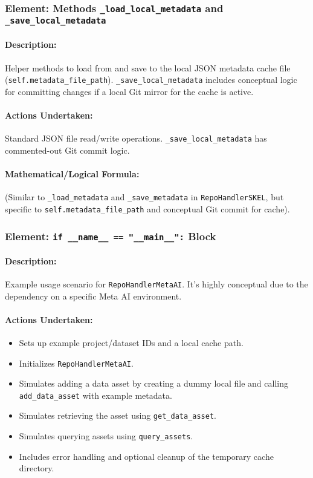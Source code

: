 \documentclass{article}
\begin{document}
\subsubsection{Element: Methods \texttt{\_load\_local\_metadata} and \texttt{\_save\_local\_metadata}}
\paragraph{Description:} Helper methods to load from and save to the local JSON metadata cache file (\texttt{self.metadata\_file\_path}). \texttt{\_save\_local\_metadata} includes conceptual logic for committing changes if a local Git mirror for the cache is active.
\paragraph{Actions Undertaken:} Standard JSON file read/write operations. \texttt{\_save\_local\_metadata} has commented-out Git commit logic.
\paragraph{Mathematical/Logical Formula:} (Similar to \texttt{\_load\_metadata} and \texttt{\_save\_metadata} in \texttt{RepoHandlerSKEL}, but specific to \texttt{self.metadata\_file\_path} and conceptual Git commit for cache).

\subsubsection{Element: \texttt{if \_\_name\_\_ == "\_\_main\_\_":} Block}
\paragraph{Description:} Example usage scenario for \texttt{RepoHandlerMetaAI}. It's highly conceptual due to the dependency on a specific Meta AI environment.
\paragraph{Actions Undertaken:}
\begin{itemize}
    \item Sets up example project/dataset IDs and a local cache path.
    \item Initializes \texttt{RepoHandlerMetaAI}.
    \item Simulates adding a data asset by creating a dummy local file and calling \texttt{add\_data\_asset} with example metadata.
    \item Simulates retrieving the asset using \texttt{get\_data\_asset}.
    \item Simulates querying assets using \texttt{query\_assets}.
    \item Includes error handling and optional cleanup of the temporary cache directory.
\end{itemize}
\end{document}
